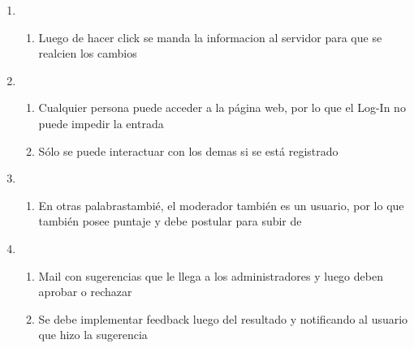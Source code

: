 \documentclass[12pt, letterpaper, notitlepage]{article}
\begin{document}
\begin{enumerate}
	\item {}
		\begin{enumerate}
			\item Luego de hacer click se manda la informacion al servidor para que se realcien los cambios
		\end{enumerate}
	
	\item {}
		\begin{enumerate}
			\item Cualquier persona puede acceder a la página web, por lo que el Log-In no puede impedir la entrada
			\item Sólo se puede interactuar con los demas si se está registrado
		\end{enumerate}				
		
	\item {}
		\begin{enumerate}
			\item En otras palabrastambié, el moderador también es un usuario, por lo que también posee puntaje y debe postular para subir de 
		\end{enumerate}
	
	\item {}
		\begin{enumerate}
			\item Mail con sugerencias que le llega a los administradores y luego deben aprobar o rechazar
			\item Se debe implementar feedback luego del resultado y notificando al usuario que hizo la sugerencia
		\end{enumerate}			
	
\end{enumerate}
\end{document}

